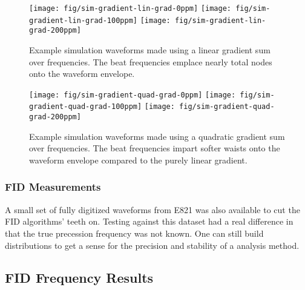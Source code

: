 \begin{figure}
\label{fig:sim-gradient-lin-grad}
\texttt{[image: fig/sim-gradient-lin-grad-0ppm]}
\texttt{[image: fig/sim-gradient-lin-grad-100ppm]}
\texttt{[image: fig/sim-gradient-lin-grad-200ppm]}
\caption{Example simulation waveforms made using a linear gradient sum over frequencies.  The beat frequencies emplace nearly total nodes onto the waveform envelope.}
\end{figure}

\begin{figure}
\label{fig:sim-gradient-quad-grad}
\texttt{[image: fig/sim-gradient-quad-grad-0ppm]}
\texttt{[image: fig/sim-gradient-quad-grad-100ppm]}
\texttt{[image: fig/sim-gradient-quad-grad-200ppm]}
\caption{Example simulation waveforms made using a quadratic gradient sum over frequencies.  The beat frequencies impart softer waists onto the waveform envelope compared to the purely linear gradient.}
\end{figure}


\subsubsection{FID Measurements}
A small set of fully digitized waveforms from E821 was also available to cut the FID algorithms' teeth on.  Testing against this dataset had a real difference in that the true precession frequency was not known.  One can still build distributions to get a sense for the precision and stability of a analysis method.


\subsection{FID Frequency Results}

